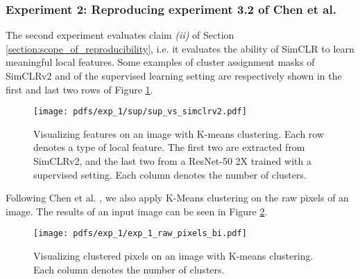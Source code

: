 \begin{table}[H]
\centering
{}
\caption{Linear eval accuracy of ResNet-18 on CIFAR-10 with a non deep projection head.}
\label{table:lin_eval_1_layer}
\end{table}


    
    \subsubsection{Experiment 2: Reproducing experiment 3.2 of Chen et al. \cite{chen2021intriguing}}
    \label{subsec:exp_1}
        The second experiment evaluates claim \textit{(ii)} of Section \ref{section:scope_of_reproducibility}, i.e. it evaluates the ability of SimCLR to learn meaningful local features.
        Some examples of cluster assignment masks of SimCLRv2 and of the supervised learning setting are respectively shown in the first and last two rows of Figure \ref{fig:exp3.2_ours_bi}.
    
        \begin{figure}[H]
            \centering
            \texttt{[image: pdfs/exp\_1/sup/sup\_vs\_simclrv2.pdf]}
            \caption{Visualizing features on an image with K-means clustering. Each row denotes a type of local feature. The first two are extracted from SimCLRv2, and the last two from a ResNet-50 2X trained with a supervised setting. Each column denotes the number of clusters.}
            \label{fig:exp3.2_ours_bi}
        \end{figure}

        
        Following Chen et al. \cite{chen2021intriguing}, we also apply K-Means clustering on the raw pixels of an image. The results of an input image can be seen in Figure \ref{fig:exp3.2_ours_raw_pixels_bi}.
        \begin{figure}[H]
            \centering
            \texttt{[image: pdfs/exp\_1/exp\_1\_raw\_pixels\_bi.pdf]}
            \caption{Visualizing clustered pixels on an image with K-means clustering. Each column denotes the number of clusters.}
            \label{fig:exp3.2_ours_raw_pixels_bi}
        \end{figure}
        
